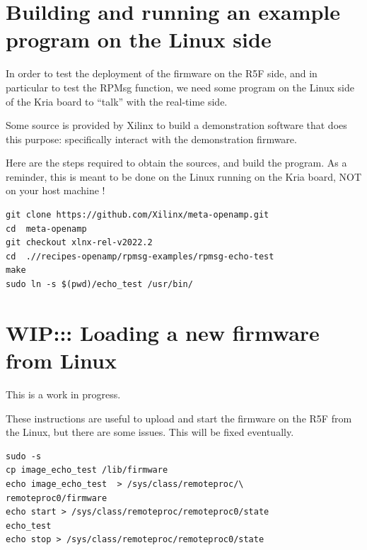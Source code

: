 \documentclass[10pt]{article}
\begin{document}
\section{Building and running an example program on the Linux side}
\label{sec:building-running-an}
In order to test the deployment of the firmware on the R5F side, and in particular
to test the RPMsg function, we need some program on the Linux side of the Kria
board to ``talk'' with the real-time side.

Some source is provided by Xilinx to build a demonstration software that does
this purpose: specifically interact with the demonstration firmware.

Here are the steps required to obtain the sources, and build the program.
As a reminder, this is meant to be done on the Linux running on the
Kria board, NOT on your host machine !
\begin{tcolorbox}
\begin{verbatim}
git clone https://github.com/Xilinx/meta-openamp.git
cd  meta-openamp
git checkout xlnx-rel-v2022.2
cd  .//recipes-openamp/rpmsg-examples/rpmsg-echo-test
make
sudo ln -s $(pwd)/echo_test /usr/bin/
\end{verbatim}
\end{tcolorbox}



\section{WIP::: Loading a new firmware from Linux}
\label{sec:loading-new-firmware}
This is a work in progress.

These instructions are useful to upload and start the firmware
on the R5F from the Linux, but there are some issues.
This will be fixed eventually.
\begin{tcolorbox}
\begin{verbatim}
sudo -s
cp image_echo_test /lib/firmware
echo image_echo_test  > /sys/class/remoteproc/\
remoteproc0/firmware
echo start > /sys/class/remoteproc/remoteproc0/state
echo_test
echo stop > /sys/class/remoteproc/remoteproc0/state
\end{verbatim}
\end{tcolorbox}



\end{document}
